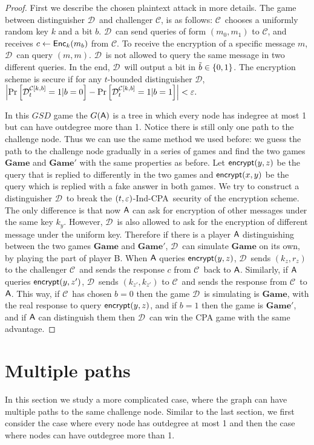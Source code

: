 \documentclass{article}
\newcommand{\tcpa}{$(t,\eps)$-Ind-CPA}
\def\B{{\sf B}}
\def\A{{\sf A}}
\def\a{${\mathcal D}$}
\def\ch{${\mathcal C}$}
\newcommand{\encrypt}{{\sf encrypt}}
\newcommand{\dgame}{{\mathbf{Game}}}
\begin{document}
\begin{proof}
First we describe the chosen plaintext attack in more details. The game between distinguisher \a~and challenger \ch, is as follows: \ch~chooses a uniformly random key $k$ and a bit $b$. \a~can send queries of form $(m_0,m_1)$ to \ch, and receives $c\leftarrow {\sf Enc}_k(m_b)$ from \ch. To receive the encryption of a specific message $m$, \a~can query $(m,m)$. \a~is not allowed to query the same message in two different queries. In the end, \a~will output a bit in $\tilde{b}\in \{0,1\}$. The encryption scheme is secure if for any $t$-bounded distinguisher \a, $\left| \Pr \left[ \mathcal{D}_t^{\mathcal{C}[k,b]}=1|b=0 \right] - \Pr \left[ \mathcal{D}_t^{\mathcal{C}[k,b]}=1|b=1 \right]  \right|< \varepsilon.$

 In this $GSD$ game the $G(\A)$ is a tree in which every node has indegree at most 1 but can have outdegree more than 1. Notice there is still only one path to the challenge node. Thus we can use the same method we used before: we guess the path to the challenge node gradually in a series of games and find the two games $\dgame$ and $\dgame'$ with the same properties as before. Let $\encrypt(y,z)$ be the query that is replied to differently in the two games and $\encrypt(x,y)$ be the query which is replied with a fake answer in both games. We try to construct a distinguisher \a~to break the \tcpa~security of the encryption scheme. The only difference is that now $\A$ can ask for encryption of other messages under the same key $k_y$. However, \a~is also allowed to ask for the encryption of different message under the uniform key. Therefore if there is a player $\A$ distinguishing between the two games $\dgame$ and $\dgame'$, \a~can simulate $\dgame$ on its own, by playing the part of player \B. When $\A$ queries $\encrypt(y,z)$, \a~sends $(k_z,r_z)$ to the challenger \ch~and sends the response $c$ from \ch~back to $\A$. Similarly, if $\A$ queries $\encrypt(y,z')$, \a~sends $(k_{z'},k_{z'})$ to \ch~and sends the response from \ch~to $\A$. This way, if \ch~has chosen $b=0$ then the game \a~is simulating is $\dgame$, with the real response to query $\encrypt(y,z)$, and if $b=1$ then the game is $\dgame'$, and if $\A$ can distinguish them then \a~can win the CPA game with the same advantage.
\end{proof}

\section{Multiple paths}

In this section we study a more complicated case, where the graph can have multiple paths to the same challenge node. Similar to the last section, we first consider the case where every node has outdegree at most 1 and then the case where nodes can have outdegree more than 1.
\end{document}
